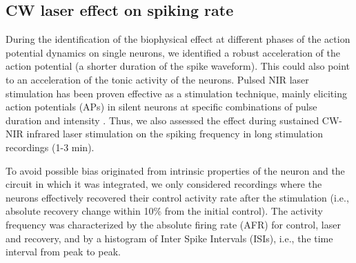 \subsection{CW laser effect on spiking rate}
During the identification of the biophysical effect at different phases of the action potential dynamics on single neurons, we identified a robust acceleration of the action potential (a shorter duration of the spike waveform). This could also point to an acceleration of the tonic activity of the neurons. Pulsed NIR laser stimulation has been proven effective as a stimulation technique, mainly eliciting action potentials (APs) in silent neurons at specific combinations of pulse duration and intensity \parencite{wells_application_2005, shapiro_infrared_2012, izzo_optical_2007, cayce_infrared_2014}. Thus, we also assessed the effect during sustained CW-NIR infrared laser stimulation on the spiking frequency in long stimulation recordings (1-3 min). 

To avoid possible bias originated from intrinsic properties of the neuron and the circuit in which it was integrated, we only considered recordings where the neurons effectively recovered their control activity rate after the stimulation (i.e., absolute recovery change within 10\% from the initial control). The activity frequency was characterized by the absolute firing rate (AFR) for control, laser and recovery, and by a histogram of Inter Spike Intervals (ISIs), i.e., the time interval from peak to peak.

